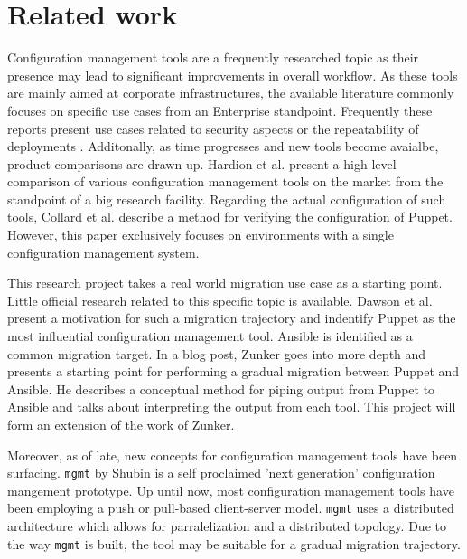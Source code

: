 \section{Related work}\label{sec:relatedwork}
Configuration management tools are a frequently researched topic as their presence may lead to significant improvements in overall workflow. As these tools are mainly aimed at corporate infrastructures, the available literature commonly focuses on specific use cases from an Enterprise standpoint. Frequently these reports present use cases related to security aspects \cite{dotson2014security} or the repeatability of deployments \cite{ruiz2015reconstructable}. Additonally, as time progresses and new tools become avaialbe, product comparisons are drawn up. Hardion et al. \cite{Hardion2013} present a high level comparison of various configuration management tools on the market from the standpoint of a big research facility. Regarding the actual configuration of such tools, Collard et al. \cite{Collard2015} describe a method for verifying the configuration of Puppet. However, this paper exclusively focuses on environments with a single configuration management system. 

This research project takes a real world migration use case as a starting point. Little official research related to this specific topic is available. Dawson et al. \cite{dawson_hall_hecht_2014} present a motivation for such a migration trajectory and indentify Puppet as the most influential configuration management tool. Ansible is identified as a common migration target. In a blog post, Zunker \cite{zunker_2014} goes into more depth and presents a starting point for performing a gradual migration between Puppet and Ansible. He describes a conceptual method for piping output from Puppet to Ansible and talks about interpreting the output from each tool. This project will form an extension of the work of Zunker.   

Moreover, as of late, new concepts for configuration management tools have been surfacing. \texttt{mgmt} by Shubin \cite{shubin2016} is a self proclaimed 'next generation' configuration mangement prototype.  Up until now, most configuration management tools have been employing a push or pull-based client-server model. \texttt{mgmt} uses a distributed architecture which allows for parralelization and a distributed topology. Due to the way \texttt{mgmt} is built, the tool may be suitable for a gradual migration trajectory. 
